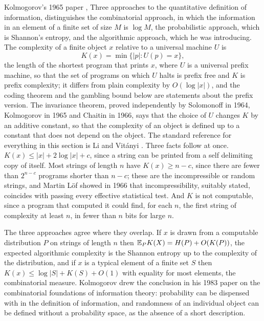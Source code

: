 Kolmogorov's 1965 paper \cite{Kolmogorov1965}, Three approaches to the quantitative definition of information, distinguishes the combinatorial approach, in which the information in an element of a finite set of size $M$ is $\log M$, the probabilistic approach, which is Shannon's entropy, and the algorithmic approach, which he was introducing. The complexity of a finite object $x$ relative to a universal machine $U$ is
\[
K(x) = \min\{ |p| : U(p) = x \} ,
\]
the length of the shortest program that prints $x$, where $U$ is a universal prefix machine, so that the set of programs on which $U$ halts is prefix free and $K$ is prefix complexity; it differs from plain complexity by $O(\log |x|)$, and the coding theorem and the gambling bound below are statements about the prefix version. The invariance theorem, proved independently by Solomonoff \cite{Solomonoff} in 1964, Kolmogorov in 1965 and Chaitin \cite{Chaitin} in 1966, says that the choice of $U$ changes $K$ by an additive constant, so that the complexity of an object is defined up to a constant that does not depend on the object. The standard reference for everything in this section is Li and Vit\'anyi \cite{LiVitanyi}. Three facts follow at once. $K(x) \le |x| + 2 \log |x| + c$, since a string can be printed from a self delimiting copy of itself. Most strings of length $n$ have $K(x) \ge n - c$, since there are fewer than $2^{n-c}$ programs shorter than $n - c$; these are the incompressible or random strings, and Martin L\"of \cite{MartinLof} showed in 1966 that incompressibility, suitably stated, coincides with passing every effective statistical test. And $K$ is not computable, since a program that computed it could find, for each $n$, the first string of complexity at least $n$, in fewer than $n$ bits for large $n$.

The three approaches agree where they overlap. If $x$ is drawn from a computable distribution $P$ on strings of length $n$ then $\mathbb{E}_P K(X) = H(P) + O(K(P))$, the expected algorithmic complexity is the Shannon entropy up to the complexity of the distribution, and if $x$ is a typical element of a finite set $S$ then $K(x) \le \log |S| + K(S) + O(1)$ with equality for most elements, the combinatorial measure. Kolmogorov drew the conclusion in his 1983 paper \cite{Kolmogorov1983} on the combinatorial foundations of information theory: probability can be dispensed with in the definition of information, and randomness of an individual object can be defined without a probability space, as the absence of a short description.

